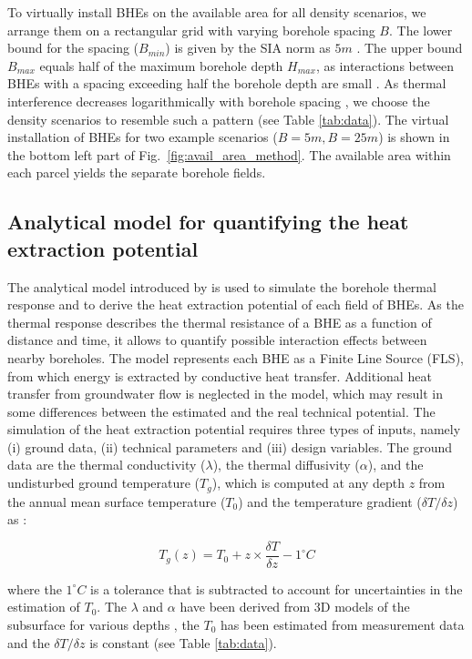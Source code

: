 To virtually install BHEs on the available area for all density scenarios, we arrange them on a rectangular grid with varying borehole spacing $B$.
The lower bound for the spacing ($B_{min}$) is given by the SIA norm as $5m$ \cite{sia_sondes_2010}.
The upper bound $B_{max}$ equals half of the maximum borehole depth $H_{max}$, as interactions between BHEs with a spacing exceeding half the borehole depth are small \cite{pahud_geothermal_2002}. 
As thermal interference decreases logarithmically with borehole spacing \cite{eskilson_thermal_1987}, we choose the density scenarios to resemble such a pattern (see Table \ref{tab:data}).
The virtual installation of BHEs for two example scenarios ($B = 5m, B = 25m$) is shown in the bottom left part of Fig.~\ref{fig:avail_area_method}. 
The available area within each parcel yields the separate borehole fields.

\subsection{Analytical model for quantifying the heat extraction potential}
\label{model}

The analytical model introduced by \citet{eskilson_thermal_1987} is used to simulate the borehole thermal response and to derive the heat extraction potential of each field of BHEs.
As the thermal response describes the thermal resistance of a BHE as a function of distance and time, it allows to quantify possible interaction effects between nearby boreholes.
The model represents each BHE as a Finite Line Source (FLS), from which energy is extracted by conductive heat transfer.
Additional heat transfer from groundwater flow is neglected in the model, which may result in some differences between the estimated and the real technical potential.
The simulation of the heat extraction potential requires three types of inputs, namely (i) ground data, (ii) technical parameters and (iii) design variables.
The ground data 
are the thermal conductivity ($\lambda$), the thermal diffusivity ($\alpha$), and the undisturbed ground temperature ($T_g$), which is computed at any depth $z$ from the annual mean surface temperature ($T_0$) and the temperature gradient ($\delta T/\delta z$) as \cite{sia_sondes_2010}:


\begin{equation}
\label{eq:Tg}
    T_g(z) = T_0 + z \times \frac{\delta T}{\delta z} - 1 ^\circ C
\end{equation}

where the $1 ^\circ C$ is a tolerance that is subtracted to account for uncertainties in the estimation of $T_0$.
The $\lambda$ and $\alpha$ have been derived from 3D models of the subsurface for various depths \cite{asit_vd_cadastre_2019-1, sitg_cadastre_2019}, the $T_0$ has been estimated from measurement data \cite{assouline_machine_2019} and the $\delta T/\delta z$ is constant (see Table \ref{tab:data}).

